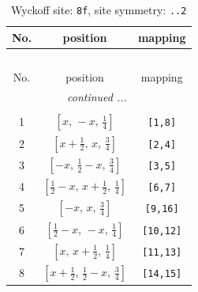 \documentclass[fleqn,8pt]{jsarticle}
\begin{document}
\begin{longtable}{ccc}
\caption{Wyckoff site: {\tt 8f}, site symmetry: {\tt ..2}}
 \\
 \hline \hline
No. & position & mapping \\ \hline \endfirsthead

\multicolumn{2}{l}{\tablename\ \thetable{}} \\
 \hline \hline
No. & position & mapping \\ \hline \endhead

 \hline \hline
\multicolumn{2}{r}{\footnotesize\it continued ...} \\ \endfoot

 \hline \hline
\multicolumn{2}{r}{} \\ \endlastfoot

1 & $\left[ x,\, - x,\, \frac{1}{4} \right]$ & {\tt [1,8]} \\ \hline
2 & $\left[ x + \frac{1}{2},\, x,\, \frac{3}{4} \right]$ & {\tt [2,4]} \\ \hline
3 & $\left[ - x,\, \frac{1}{2} - x,\, \frac{3}{4} \right]$ & {\tt [3,5]} \\ \hline
4 & $\left[ \frac{1}{2} - x,\, x + \frac{1}{2},\, \frac{1}{4} \right]$ & {\tt [6,7]} \\ \hline
5 & $\left[ - x,\, x,\, \frac{3}{4} \right]$ & {\tt [9,16]} \\ \hline
6 & $\left[ \frac{1}{2} - x,\, - x,\, \frac{1}{4} \right]$ & {\tt [10,12]} \\ \hline
7 & $\left[ x,\, x + \frac{1}{2},\, \frac{1}{4} \right]$ & {\tt [11,13]} \\ \hline
8 & $\left[ x + \frac{1}{2},\, \frac{1}{2} - x,\, \frac{3}{4} \right]$ & {\tt [14,15]} \\
\end{longtable}
\renewcommand{\arraystretch}{1.2}
\end{document}
